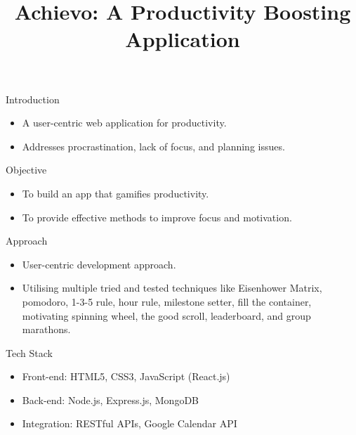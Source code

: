 \documentclass{beamer}
\title{Achievo: A Productivity Boosting Application}
\author{}
\date{}
\begin{document}
\begin{frame}[plain]
  \titlepage
\end{frame}

\begin{frame}{Introduction}
    \begin{itemize}
        \item A user-centric web application for productivity.
        \item Addresses procrastination, lack of focus, and planning issues.
    \end{itemize}
\end{frame}

\begin{frame}{Objective}
    \begin{itemize}
        \item To build an app that gamifies productivity.
        \item To provide effective methods to improve focus and motivation.
    \end{itemize}
\end{frame}

\begin{frame}{Approach}
    \begin{itemize}
        \item User-centric development approach.
        \item Utilising multiple tried and tested techniques like Eisenhower Matrix, pomodoro, 1-3-5 rule, hour rule, milestone setter, fill the container, motivating spinning wheel, the good scroll, leaderboard, and group marathons.
    \end{itemize}
\end{frame}

\begin{frame}{Tech Stack}
    \begin{itemize}
        \item Front-end: HTML5, CSS3, JavaScript (React.js)
        \item Back-end: Node.js, Express.js, MongoDB
        \item Integration: RESTful APIs, Google Calendar API
    \end{itemize}
\end{frame}
\end{document}
